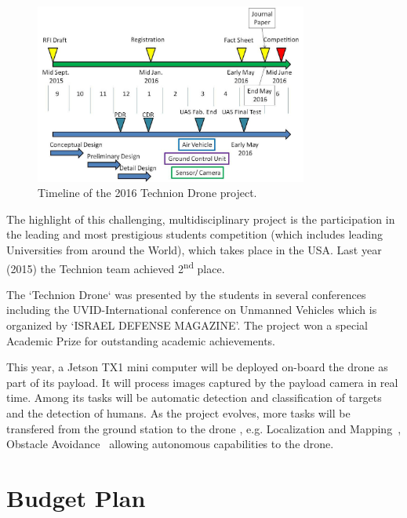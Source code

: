 \documentclass{article} %
\begin{document}
\begin{figure}[h]
	\centering
	\includegraphics[width=0.8\textwidth]{project_timeline}
	\caption{Timeline of the 2016 Technion Drone project.}
	\label{fig:drone}
\end{figure}
The highlight of this challenging,
multidisciplinary project is the participation in the leading and most
prestigious students competition (which includes leading Universities from around
the World), which takes place in the USA. Last year (2015) the Technion team
achieved 2\textsuperscript{nd} place.

The `Technion Drone` was presented by the students in several conferences
including the UVID-International conference on Unmanned Vehicles which is
organized by `ISRAEL DEFENSE MAGAZINE'. The project won a special Academic Prize
for outstanding academic achievements.

This year, a Jetson TX1 mini computer will be deployed on-board the drone as part of
its payload. It will process images captured by the payload camera in real time.
Among its tasks will be  automatic detection and classification of targets
and the detection of humans. As the project evolves, more tasks will be
transfered from the ground station to the drone , e.g. Localization and Mapping~\cite{Nardi2014},
Obstacle Avoidance~\cite{Michels2005} allowing
autonomous capabilities to the drone.

\section{Budget Plan}
\end{document}
